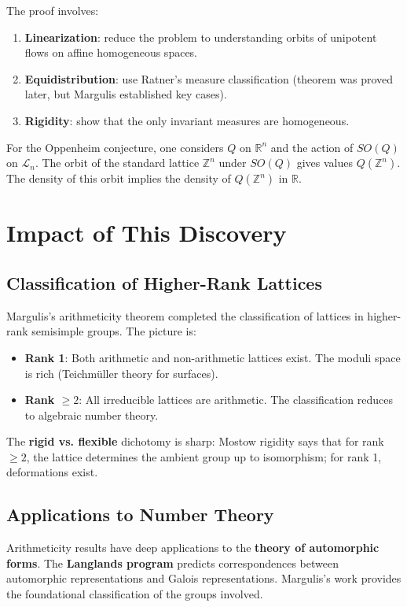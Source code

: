 The proof involves:
\begin{enumerate}
\item \textbf{Linearization}: reduce the problem to understanding
orbits of unipotent flows on affine homogeneous spaces.
\item \textbf{Equidistribution}: use Ratner's measure classification
(theorem was proved later, but Margulis established key cases).
\item \textbf{Rigidity}: show that the only invariant measures are
homogeneous.
\end{enumerate}

For the Oppenheim conjecture, one considers $Q$ on $\mathbb{R}^n$ and
the action of $SO(Q)$ on $\mathcal{L}_n$. The orbit of the standard
lattice $\mathbb{Z}^n$ under $SO(Q)$ gives values $Q(\mathbb{Z}^n)$.
The density of this orbit implies the density of $Q(\mathbb{Z}^n)$ in
$\mathbb{R}$.

\section{Impact of This Discovery}

\subsection{Classification of Higher-Rank Lattices}

Margulis's arithmeticity theorem completed the classification of
lattices in higher-rank semisimple groups. The picture is:

\begin{itemize}
\item \textbf{Rank 1}: Both arithmetic and non-arithmetic lattices
exist. The moduli space is rich (Teichmüller theory for surfaces).
\item \textbf{Rank $\geq 2$}: All irreducible lattices are arithmetic.
The classification reduces to algebraic number theory.
\end{itemize}

The \textbf{rigid vs. flexible} dichotomy is sharp: Mostow rigidity
says that for rank $\geq 2$, the lattice determines the ambient group
up to isomorphism; for rank 1, deformations exist.

\subsection{Applications to Number Theory}

Arithmeticity results have deep applications to the \textbf{theory of
automorphic forms}. The \textbf{Langlands program} predicts
correspondences between automorphic representations and Galois
representations. Margulis's work provides the foundational
classification of the groups involved.

